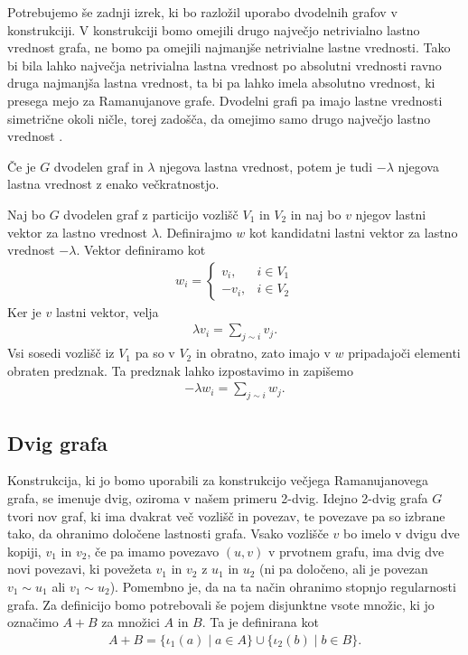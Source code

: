 Potrebujemo še zadnji izrek, ki bo razložil uporabo dvodelnih grafov v konstrukciji. V konstrukciji bomo omejili drugo največjo netrivialno lastno vrednost grafa, ne bomo pa omejili najmanjše netrivialne lastne vrednosti. Tako bi bila lahko največja netrivialna lastna vrednost po absolutni vrednosti ravno druga najmanjša lastna vrednost, ta bi pa lahko imela absolutno vrednost, ki presega mejo za Ramanujanove grafe. Dvodelni grafi pa imajo lastne vrednosti simetrične okoli ničle, torej zadošča, da omejimo samo drugo največjo lastno vrednost \cite{godsil}.

\begin{izrek}
    Če je \(G\) dvodelen graf in \(\lambda\) njegova lastna vrednost, potem je tudi \(-\lambda\) njegova lastna vrednost z enako večkratnostjo.
\end{izrek}
\begin{dokaz}
    Naj bo \(G\) dvodelen graf z particijo vozlišč \(V_1\) in \(V_2\) in naj bo \(v\) njegov lastni vektor za lastno vrednost \(\lambda\). Definirajmo \(w\) kot kandidatni lastni vektor za lastno vrednost \(-\lambda\). Vektor definiramo kot
    \begin{align*}
        w_i = \begin{cases}
                  v_i,  & i\in V_1 \\
                  -v_i, & i\in V_2
              \end{cases}
    \end{align*}
    Ker je \(v\) lastni vektor, velja
    \begin{align*}
        \lambda v_i = \sum_{j\sim i} v_j.
    \end{align*}
    Vsi sosedi vozlišč iz \(V_1\) pa so v \(V_2\) in obratno, zato imajo v \(w\) pripadajoči elementi obraten predznak. Ta predznak lahko izpostavimo in zapišemo
    \begin{align*}
        -\lambda w_i = \sum_{j\sim i} w_j.
    \end{align*}
\end{dokaz}

\subsection{Dvig grafa}
Konstrukcija, ki jo bomo uporabili za konstrukcijo večjega Ramanujanovega grafa, se imenuje dvig, oziroma v našem primeru 2-dvig. Idejno 2-dvig grafa \(G\) tvori nov graf, ki ima dvakrat več vozlišč in povezav, te povezave pa so izbrane tako, da ohranimo določene lastnosti grafa. Vsako vozlišče \(v\) bo imelo v dvigu dve kopiji, \(v_1\) in \(v_2\), če pa imamo povezavo \((u, v)\) v prvotnem grafu, ima dvig dve novi povezavi, ki povežeta \(v_1\) in \(v_2\) z \(u_1\) in \(u_2\) (ni pa določeno, ali je povezan \(v_1\sim u_1\) ali \(v_1\sim u_2\)). Pomembno je, da na ta način ohranimo stopnjo regularnosti grafa. Za definicijo bomo potrebovali še pojem disjunktne vsote množic, ki jo označimo \(A+B\) za množici \(A\) in \(B\). Ta je definirana kot
\begin{align*}
    A+B = \{\iota_1(a) \mid a \in A\}\cup \{\iota_2(b) \mid b\in B\}.
\end{align*}

